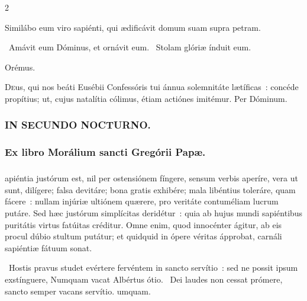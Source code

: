 \documentclass[9pt,twoside]{extarticle}
\begin{document}
\begin{multicols}{2}
\begin{tightlist}{}
\item {} Similábo eum viro sapiénti, qui ædificávit domum suam supra petram.
\item {}~Amávit eum Dóminus, et ornávit eum. ~Stolam glóriæ índuit eum.
\item Orémus. \hfill {}
\end{tightlist}
\lettrine{D}eus, qui nos beáti Eusébii Confessóris tui ánnua solemnitáte lætíficas~: concéde propítius; ut, cujus natalítia cólimus, étiam actiónes imitémur. Per Dóminum.

\begin{tightlist}{}
\item {}
\end{tightlist}

\subsubsection*{\center \textsc{IN SECUNDO NOCTURNO.}}
\subsubsection*{\center Ex libro Morálium sancti Gregórii Papæ.}
\subsubsection*{\center {}}
apiéntia justórum est, nil per ostensiónem fíngere, sensum verbis aperíre, vera ut sunt, dilígere; falsa devitáre; bona gratis exhibére; mala libéntius toleráre, quam fácere~: nullam injúriæ ultiónem quærere, pro veritáte contuméliam lucrum putáre. Sed hæc justórum simplícitas deridétur~: quia ab hujus mundi sapiéntibus puritátis virtus fatúitas créditur. Omne enim, quod innocénter ágitur, ab eis procul dúbio stultum putátur; et quidquid in ópere véritas ápprobat, carnáli sapiéntiæ fátuum sonat.

\begin{tightlist}{}
\item {}~Hostis pravus studet evértere fervéntem in sancto servítio~: sed ne possit ipsum exstínguere, \textred{*} Numquam vacat Albértus ótio. 
~Dei laudes non cessat prómere, sancto semper vacans servítio. umquam.
\end{tightlist}


\end{multicols}
\end{document}

